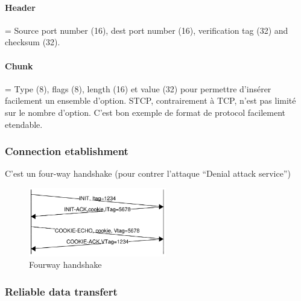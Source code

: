 \paragraph{Header} = Source port number (16), dest port number (16), verification tag (32) and checksum (32).

\paragraph{Chunk} = Type (8), flags (8), length (16) et value (32) pour permettre d'insérer facilement un ensemble d'option. 
STCP, contrairement à TCP, n'est pas limité sur le nombre d'option. C'est bon exemple de format de protocol facilement etendable.
 

\subsubsection{Connection etablishment}
C'est un four-way handshake (pour contrer l'attaque ``Denial attack service'')

\begin{figure}[h]
    \centering
    \includegraphics[width=6cm]{fourway.png}
    \caption{Fourway handshake}
\end{figure}

\subsubsection{Reliable data transfert}

